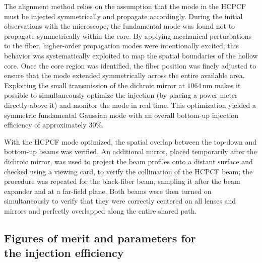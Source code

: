 The alignment method relies on the assumption that the mode in the HCPCF must be injected symmetrically and propagate accordingly. During the initial observations with the microscope, the fundamental mode was found not to propagate symmetrically within the core. By applying mechanical perturbations to the fiber, higher-order propagation modes were intentionally excited; this behavior was systematically exploited to map the spatial boundaries of the hollow core. Once the core region was identified, the fiber position was finely adjusted to ensure that the mode extended symmetrically across the entire available area.  Exploiting the small transmission of the dichroic mirror at $1064\,\mathrm{nm}$ makes it possible to simultaneously optimize the injection (by placing a power meter directly above it) and monitor the mode in real time.
This optimization yielded a symmetric fundamental Gaussian mode with an overall bottom-up injection efficiency of approximately $30\%$.

With the HCPCF mode optimized, the spatial overlap between the top-down and bottom-up beams was verified. An additional mirror, placed temporarily after the dichroic mirror, was used to project the beam profiles onto a distant surface and checked using a viewing card, to verify the collimation of the HCPCF beam; the procedure was repeated for the black-fiber beam, sampling it after the beam expander and at a far-field plane. Both beams were then turned on simultaneously to verify that they were correctly centered on all lenses and mirrors and perfectly overlapped along the entire shared path.
\subsection[Figures of merit and parameters for the injection efficiency]{Figures of merit and parameters for \\ the injection efficiency}
\label{subsec:upper_figures_of_merit}

